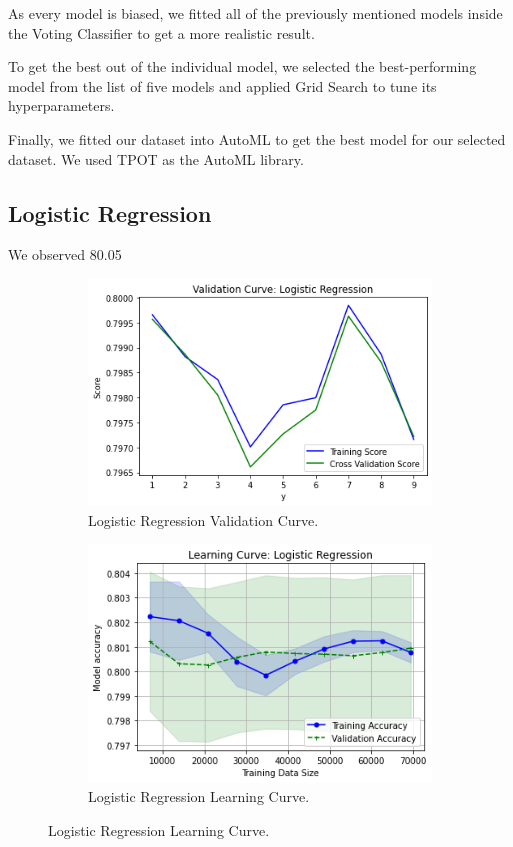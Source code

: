 As every model is biased, we fitted all of the previously mentioned models inside the Voting Classifier to get a more realistic result.

To get the best out of the individual model, we selected the best-performing model from the list of five models and applied Grid Search to tune its hyperparameters.

Finally, we fitted our dataset into AutoML to get the best model for our selected dataset. We used TPOT as the AutoML library.

\subsection{Logistic Regression}
We observed 80.05%
\begin{figure}[h]
\centering
\begin{subfigure}[b]{0.45\linewidth}
    \includegraphics[width=\linewidth]{lrvc}
    \caption{Logistic Regression Validation Curve.}
\end{subfigure}
\begin{subfigure}[b]{0.45\linewidth}
    \includegraphics[width=\linewidth]{lrlc}
    \caption{Logistic Regression Learning Curve.}
\end{subfigure}
\end{figure}

